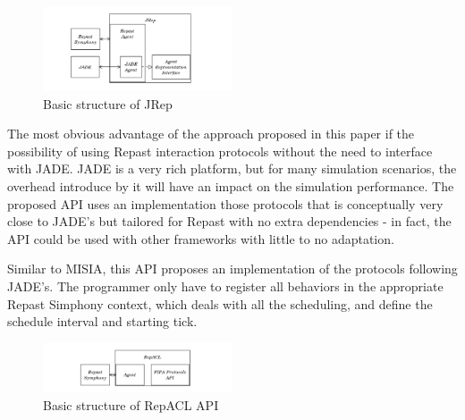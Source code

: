 \begin{figure}[h]
	\centering
	\includegraphics[width=0.5\textwidth]{figures/jrep.png}
	\caption{Basic structure of JRep}
	\label{fig:jrep}
\end{figure}

The most obvious advantage of the approach proposed in this paper if the possibility of using Repast interaction protocols without the need to interface with JADE. JADE is a very rich platform, but for many simulation scenarios, the overhead introduce by it will have an impact on the simulation performance. The proposed API uses an implementation those protocols that is conceptually very close to JADE's but tailored for Repast with no extra dependencies - in fact, the API could be used with other frameworks with little to no adaptation.

Similar to MISIA, this API proposes an implementation of the protocols following JADE's. The programmer only have to register all behaviors in the appropriate Repast Simphony context, which deals with all the scheduling, and define the schedule interval and starting tick.

\begin{figure}[h]
	\centering
	\includegraphics[width=0.5\textwidth]{figures/repacl.png}
	\caption{Basic structure of RepACL API}
	\label{fig:relate-repacl}
\end{figure}